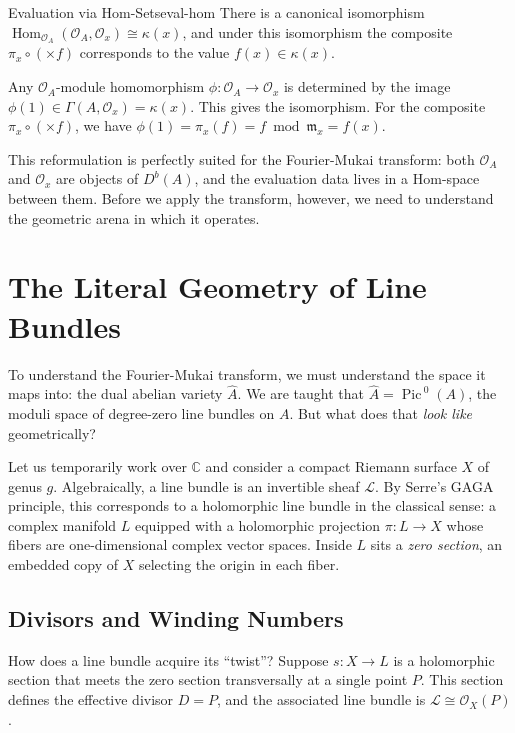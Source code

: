 \documentclass{article}
\newcommand{\C}{{\mathbb{C}}}
\newcommand{\CL}{{\mathcal{L}}}
\newcommand{\CO}{{\mathcal{O}}}
\newcommand{\fm}{{\mathfrak{m}}}
\newcommand{\Hom}{{\operatorname{Hom}}}
\newcommand{\Pic}{{\operatorname{Pic}\,}}
\let\temp\phi
\let\phi\varphi
\let\varphi\temp
\begin{document}
\begin{prop}{Evaluation via Hom-Sets}{eval-hom}
There is a canonical isomorphism $\Hom_{\CO_A}(\CO_A, \CO_x) \cong \kappa(x)$, and under this isomorphism the composite $\pi_x \circ (\times f)$ corresponds to the value $f(x) \in \kappa(x)$.
\end{prop}

\begin{Proof}
Any $\CO_A$-module homomorphism $\varphi\colon \CO_A \to \CO_x$ is determined by the image $\varphi(1) \in \Gamma(A, \CO_x) = \kappa(x)$. This gives the isomorphism. For the composite $\pi_x \circ (\times f)$, we have $\varphi(1) = \pi_x(f) = f \bmod \fm_x = f(x)$.
\end{Proof}

This reformulation is perfectly suited for the Fourier-Mukai transform: both $\CO_A$ and $\CO_x$ are objects of $D^b(A)$, and the evaluation data lives in a Hom-space between them. Before we apply the transform, however, we need to understand the geometric arena in which it operates.


\section{The Literal Geometry of Line Bundles}

To understand the Fourier-Mukai transform, we must understand the space it maps into: the dual abelian variety $\hat{A}$. We are taught that $\hat{A} = \Pic^0(A)$, the moduli space of degree-zero line bundles on $A$. But what does that \emph{look like} geometrically?

Let us temporarily work over $\C$ and consider a compact Riemann surface $X$ of genus $g$. Algebraically, a line bundle is an invertible sheaf $\CL$. By Serre's GAGA principle, this corresponds to a holomorphic line bundle in the classical sense: a complex manifold $L$ equipped with a holomorphic projection $\pi\colon L \to X$ whose fibers are one-dimensional complex vector spaces. Inside $L$ sits a \emph{zero section}, an embedded copy of $X$ selecting the origin in each fiber.

\subsection{Divisors and Winding Numbers}

How does a line bundle acquire its ``twist''? Suppose $s\colon X \to L$ is a holomorphic section that meets the zero section transversally at a single point $P$. This section defines the effective divisor $D = P$, and the associated line bundle is $\CL \cong \CO_X(P)$.
\end{document}
